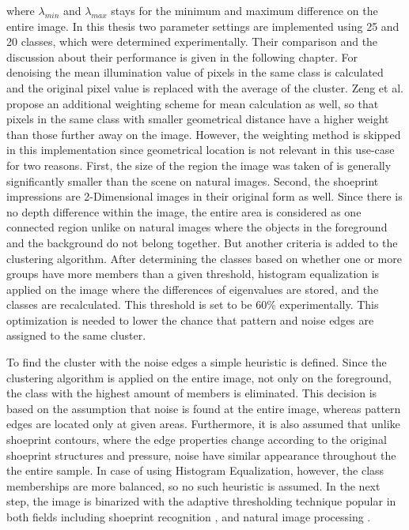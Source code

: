 \documentclass[draft,final]{vutinfth} %
\begin{document}
where $\lambda_{min}$ and $\lambda_{max}$ stays for the minimum and maximum difference on the entire image.
In this thesis two parameter settings are implemented using 25 and 20 classes, which were determined experimentally.
Their comparison and the discussion about their performance is given in the following chapter.
For denoising the mean illumination value of pixels in the same class is calculated and the original pixel value is replaced with the average of the cluster.
Zeng et al. \cite{zeng2011region} propose an additional weighting scheme for mean calculation as well, so that pixels in the same class with smaller geometrical distance have a higher weight than those further away on the image.
However, the weighting method is skipped in this implementation since geometrical location is not relevant in this use-case for two reasons.
First, the size of the region the image was taken of is generally significantly smaller than the scene on natural images.
Second, the shoeprint impressions are 2-Dimensional images in their original form as well. 
Since there is no depth difference within the image, the entire area is considered as one connected region unlike on natural images where the objects in the foreground and the background do not belong together.
But another criteria is added to the clustering algorithm.
After determining the classes based on whether one or more groups have more members than a given threshold, histogram equalization is applied on the image where the differences of eigenvalues are stored, and the classes are recalculated.
This threshold is set to be 60\% experimentally.
This optimization is needed to lower the chance that pattern and noise edges are assigned to the same cluster. 
\par
To find  the cluster with the noise edges a simple heuristic is defined.
Since the clustering algorithm is applied on the entire image, not only on the foreground, the class with the highest amount of members is eliminated.
This decision is based on the assumption that noise is found at the entire image, whereas pattern edges are located only at given areas.
Furthermore, it is also assumed that unlike shoeprint contours, where the edge properties change according to the original shoeprint structures and pressure, noise have similar appearance throughout the the entire sample.
In case of using Histogram Equalization, however, the class memberships are more balanced, so no such heuristic is assumed.
In the next step, the image is binarized with the adaptive thresholding technique \cite{laine1996multiscale} popular in both fields including shoeprint recognition  \cite{wang2014automatic}, \cite{li2014retrieval} and natural image processing \cite{xu2016image}.
\end{document}
